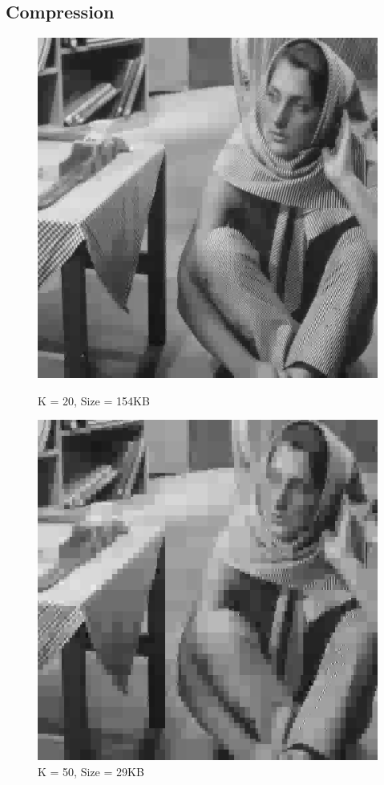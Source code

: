 \documentclass{article}
\begin{document}
    \subsection*{Compression}

    \begin{figure}[!htb]
      \includegraphics[scale=0.4]{./compression/1/20.png}
      \caption{K = 20, Size = 154KB}
    \endminipage \hfill
      \includegraphics[scale=.4]{./compression/1/50.png}
      \caption{K = 50, Size = 29KB}
    \endminipage
    \end{figure}
    
\end{document}
